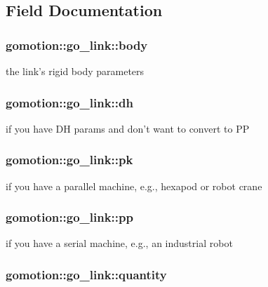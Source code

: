 \subsection{Field Documentation}
\hypertarget{structgomotion_1_1go__link_a27aa5b81fdb2402883899a11375891c3}{
\subsubsection[{body}]{ gomotion\-::go\-\_\-link\-::body}}\label{structgomotion_1_1go__link_a27aa5b81fdb2402883899a11375891c3}
the link's rigid body parameters \hypertarget{structgomotion_1_1go__link_acb0559852ab118cc11f102bb11ff9811}{
\subsubsection[{dh}]{ gomotion\-::go\-\_\-link\-::dh}}\label{structgomotion_1_1go__link_acb0559852ab118cc11f102bb11ff9811}
if you have D\-H params and don't want to convert to P\-P \hypertarget{structgomotion_1_1go__link_a681e1395c9921b192466d8a27c348d4d}{
\subsubsection[{pk}]{ gomotion\-::go\-\_\-link\-::pk}}\label{structgomotion_1_1go__link_a681e1395c9921b192466d8a27c348d4d}
if you have a parallel machine, e.\-g., hexapod or robot crane \hypertarget{structgomotion_1_1go__link_aeb6fd1a42fc5194080ffa0f89dae8e20}{
\subsubsection[{pp}]{ gomotion\-::go\-\_\-link\-::pp}}\label{structgomotion_1_1go__link_aeb6fd1a42fc5194080ffa0f89dae8e20}
if you have a serial machine, e.\-g., an industrial robot \hypertarget{structgomotion_1_1go__link_aa70635d6c7483d989c6cd8c0616145a5}{
\subsubsection[{quantity}]{ gomotion\-::go\-\_\-link\-::quantity}}\label{structgomotion_1_1go__link_aa70635d6c7483d989c6cd8c0616145a5}
